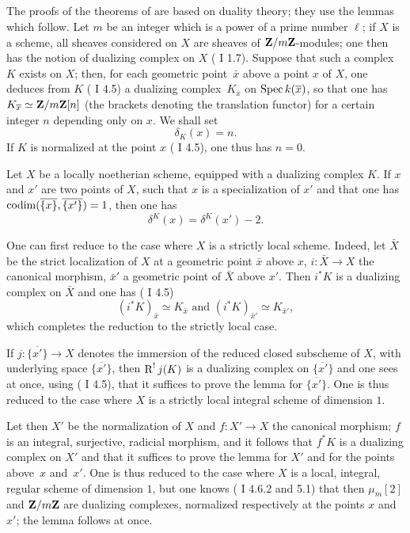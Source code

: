 \subsection{} \label{XIV.2.3}
The proofs of the theorems of \numero {} are based on duality theory; they use the lemmas which follow. Let $m$ be an integer which is a power of a prime number $\ell$; if $X$ is a scheme, all sheaves considered on $X$ are sheaves of $\mathbf{Z}/m\mathbf{Z}$-modules; one then has the notion of dualizing complex on $X$ ( I 1.7). Suppose that such a complex $K$ exists on $X$; then, for each geometric point~$\bar x$ above a point $x$ of $X$, one deduces from $K$ (\cf {} I 4.5) a dualizing complex~$K_{\bar x}$ on $\operatorname{Spec} k(\overline x)$, so that one has $K_{\overline x}\simeq\mathbf{Z}/m\mathbf{Z}[n]$ (the brackets denoting the translation functor) for a certain integer $n$ depending only on $x$. We shall set
$$
\delta_K(x)=n.
$$
If $K$ is normalized at the point $x$ ( I 4.5), one thus has $n=0$.

\begin{sublemma} \label{XIV.2.3.1} Let $X$ be a locally noetherian scheme, equipped with a dualizing complex $K$. If $x$ and $x'$ are two points of $X$, such that $x$ is a specialization of $x'$ and that one has $\operatorname{codim}(\overline{\{x\}}, \overline{\{x'\}})=1$, then one has
$$
\delta^K(x)=\delta^{K}(x')-2.
$$
\end{sublemma}

One can first reduce to the case where $X$ is a strictly local scheme. Indeed, let $\bar X$ be the strict localization of $X$ at a geometric point $\bar x$ above $x$, $i:\bar X\to X$ the canonical morphism, $\bar x'$ a geometric point of $\bar X$ above $x'$. Then $i^*K$ is a dualizing complex on $\bar X$ and one has ( I 4.5)
$$
(i^*K)_{\bar x}\simeq K_{\bar x}\text{ and } (i^*K)_{\bar x'}\simeq K_{\bar x'},
$$
which completes the reduction to the strictly local case.

If $j:\overline{\{x'\}}\to X$ denotes the immersion of the reduced closed subscheme of $X$, with underlying space $\overline{\{x'\}}$, then $\operatorname{R}^!j(K)$ is a dualizing complex on $\overline{\{x'\}}$ and one sees at once, using ( I 4.5), that it suffices to prove the lemma for $\overline{\{x'\}}$. One is thus reduced to the case where $X$ is a strictly local integral scheme of dimension $1$.

Let then $X'$ be the normalization of $X$ and $f:X'\to X$ the canonical morphism; $f$ is an integral, surjective, radicial morphism, and it follows that $f^*K$ is a dualizing complex on $X'$ and that it suffices to prove the lemma for $X'$ and for the points above~$x$ and~$x'$. One is thus reduced to the case where $X$ is a local, integral, regular scheme of dimension $1$, but one knows (\cf {} I 4.6.2 and 5.1) that then $\mu_m[2]$ and $\mathbf{Z}/m\mathbf{Z}$ are dualizing complexes, normalized respectively at the points $x$ and $x'$; the lemma follows at once.


